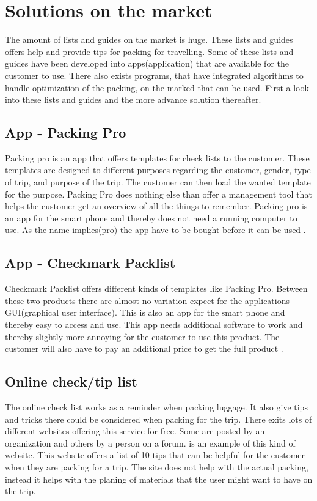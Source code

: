 \section{Solutions on the market}

The amount of lists and guides on the market is huge. These lists and guides offers help and provide tips for packing for travelling. Some of these lists and guides have been developed into apps(application) that are available for the customer to use.
There also exists programs, that have integrated algorithms to handle optimization of the packing, on the marked that can be used.
First a look into these lists and guides and the more advance solution thereafter.

\subsection{App - Packing Pro}

Packing pro is an app that offers templates for check lists to the customer. These templates are designed to different purposes regarding the customer, gender, type of trip, and purpose of the trip.
The customer can then load the wanted template for the purpose. Packing Pro does nothing else than offer a management tool that helps the customer get an overview of all the things to remember. Packing pro is an app for the smart phone and thereby does not need a running computer to use. As the name implies(pro) the app have to be bought before it can be used \citep{packingpro}.

\subsection{App - Checkmark Packlist}

Checkmark Packlist offers different kinds of templates like Packing Pro. Between these two products there are almost no variation expect for the applications GUI(graphical user interface). This is also an app for the smart phone and thereby easy to access and use.
This app needs additional software to work and thereby slightly more annoying for the customer to use this product. The customer will also have to pay an additional price to get the full product \citep{checkpacklist}.

\subsection{Online check/tip list}

The online check list works as a reminder when packing luggage. It also give tips and tricks there could be considered when packing for the trip. There exits lots of different websites offering this service for free. Some are posted by an organization and others by a person on a forum.
\citep{onlinecheck} is an example of this kind of website. This website offers a list of 10 tips that can be helpful for the customer when they are packing for a trip. The site does not help with the actual packing, instead it helps with the planing of materials that the user might want to have on the trip.

